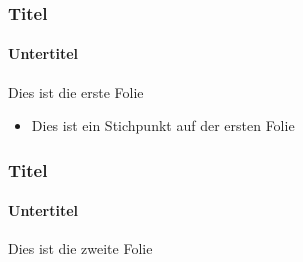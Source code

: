 \documentclass[handout]{beamer}
\begin{document}
\begin{frame}
\frametitle{Titel}
\framesubtitle{Untertitel}
Dies ist die erste Folie
\begin{itemize}
	\item Dies ist ein Stichpunkt auf der ersten Folie
\end{itemize}
\end{frame}

\begin{frame}
\frametitle{Titel}
\framesubtitle{Untertitel}
Dies ist die zweite Folie
\end{frame}
\end{document}

